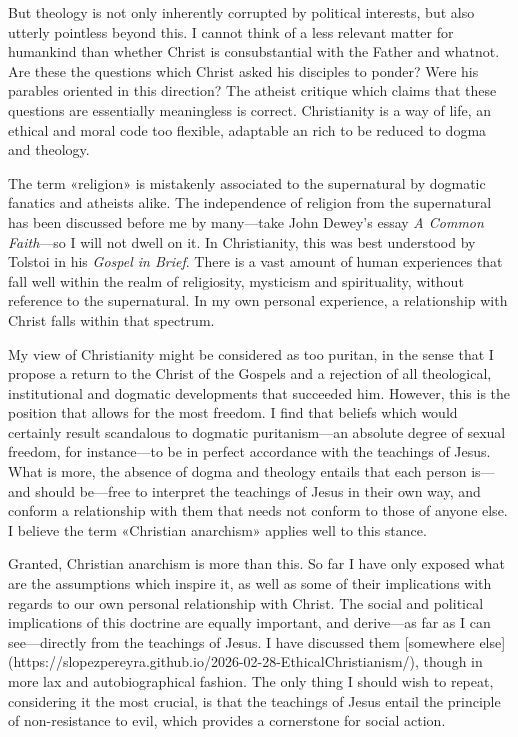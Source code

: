 \documentclass[a4paper, 12pt]{article}
\begin{document}
But theology is not only inherently corrupted by political interests, but also
utterly pointless beyond this. I cannot think of a less relevant matter for
humankind than whether Christ is consubstantial with the Father and whatnot. Are
these the questions which Christ asked his disciples to ponder? Were his
parables oriented in this direction? The atheist critique which claims that
these questions are essentially meaningless is correct. Christianity is a way of
life, an ethical and moral code too flexible, adaptable an rich to be reduced to
dogma and theology. 

The term «religion» is mistakenly associated to the supernatural by dogmatic
fanatics and atheists alike. The independence of religion from the supernatural
has been discussed before me by many---take John Dewey's essay \textit{A Common
Faith}---so I will not dwell on it. In Christianity, this was best understood by
Tolstoi in his \textit{Gospel in Brief}. There is a vast amount of human
experiences that fall well within the realm of religiosity, mysticism and
spirituality, without reference to the supernatural. In my own personal
experience, a relationship with Christ falls within that spectrum.

My view of Christianity might be considered as too puritan, in the sense that I
propose a return to the Christ of the Gospels and a rejection of all
theological, institutional and dogmatic developments that succeeded him.
However, this is the position that allows for the most freedom. I find that
beliefs which would certainly result scandalous to dogmatic puritanism---an
absolute degree of sexual freedom, for instance---to be in perfect
accordance with the teachings of Jesus. What is more, the absence of dogma and
theology entails that each person is---and should be---free to interpret the
teachings of Jesus in their own way, and conform a relationship with them that
needs not conform to those of anyone else. I believe the term «Christian
anarchism» applies well to this stance.

Granted, Christian anarchism is more than this. So far I have only exposed what
are the assumptions which inspire it, as well as some of their implications with
regards to our own personal relationship with Christ. The social and political
implications of this doctrine are equally important, and derive---as far as I
can see---directly from the teachings of Jesus. I have discussed them [somewhere
else](https://slopezpereyra.github.io/2026-02-28-EthicalChristianism/), though
in more lax and autobiographical fashion. The only thing I should wish to
repeat, considering it the most crucial, is that the teachings of Jesus entail
the principle of non-resistance to evil, which provides a cornerstone for social
action.
\end{document}
